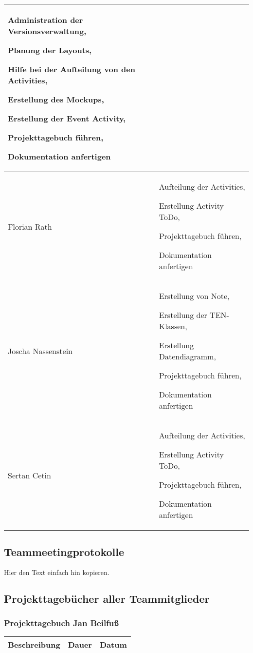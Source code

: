 \begin{longtable}{|p{4cm}|p{10cm}|}
Administration der Versionsverwaltung,

Planung der Layouts,

Hilfe bei der Aufteilung von den Activities,

Erstellung des Mockups, 

Erstellung der Event Activity, 

Projekttagebuch führen, 

Dokumentation anfertigen \\ \hline
Florian Rath  & Aufteilung der Activities, 

Erstellung Activity ToDo, 

Projekttagebuch führen, 

Dokumentation anfertigen \\ \hline
Joscha Nassenstein & Erstellung von Note, 

Erstellung der TEN-Klassen,  

Erstellung Datendiagramm, 

Projekttagebuch führen, 

Dokumentation anfertigen \\ \hline
Sertan Cetin &  Aufteilung der Activities, 

Erstellung Activity ToDo, 

Projekttagebuch führen, 

Dokumentation anfertigen \\ \hline
\end{longtable}

\subsection{Teammeetingprotokolle}

Hier den Text einfach hin kopieren.

\subsection{Projekttagebücher aller Teammitglieder}
\subsubsection{Projekttagebuch Jan Beilfuß}
\begin{longtable}{|p{10cm}|p{2cm}|p{2cm}|}
\hline
{\textbf{Beschreibung}} & {\textbf{Dauer}} & {\textbf{Datum}} \\ \hline

\end{longtable}

